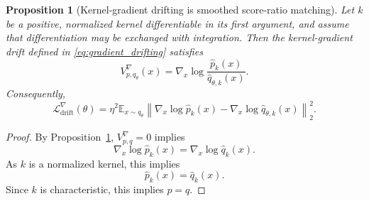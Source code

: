 \documentclass[10pt,a4paper]{amsart}
\newtheorem{proposition}{Proposition}
\begin{document}
\begin{proposition}[Kernel-gradient drifting is smoothed score-ratio matching]
\label{prop:score_ratio_matching}
Let \(k\) be a positive, normalized kernel differentiable in its first argument, and assume that
differentiation may be exchanged with integration. Then the kernel-gradient drift
defined in \eqref{eq:gradient_drifting} satisfies
\[
V^\nabla_{p,q_\theta}(x)
=
\nabla_x \log
\frac{\widehat{p}_k(x)}
     {\widehat{q}_{\theta,k}(x)}.
\]
Consequently,
\[
\mathcal{L}^{\nabla}_\mathrm{drift}(\theta)
=
\eta^2
\mathbb{E}_{x\sim q_\theta}
\left\|
\nabla_x \log \widehat{p}_k(x)
-
\nabla_x \log \widehat{q}_{\theta,k}(x)
\right\|_2^2.
\]
\end{proposition}

\begin{proof}
By Proposition~\ref{prop:score_ratio_matching}, \(V^\nabla_{p,q}=0\) implies
\[
\nabla_x \log \widehat{p}_k(x)
=
\nabla_x \log \widehat{q}_k(x).
\]
As $k$ is a normalized kernel, this implies
\[
\widehat{p}_k(x)
=
\widehat{q}_k(x).
\]
Since \(k\) is characteristic, this implies \(p=q\).
\end{proof}
\end{document}
